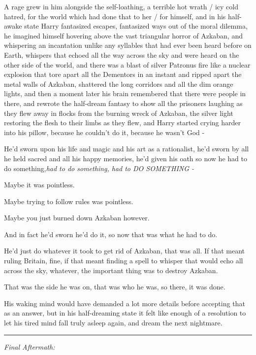 A rage grew in him alongside the self-loathing, a terrible hot wrath /
icy cold hatred, for the world which had done that to her / for himself,
and in his half-awake state Harry fantasized escapes, fantasized ways
out of the moral dilemma, he imagined himself hovering above the vast
triangular horror of Azkaban, and whispering an incantation unlike any
syllables that had ever been heard before on Earth, whispers that echoed
all the way across the sky and were heard on the other side of the
world, and there was a blast of silver Patronus fire like a nuclear
explosion that tore apart all the Dementors in an instant and ripped
apart the metal walls of Azkaban, shattered the long corridors and all
the dim orange lights, and then a moment later his brain remembered that
there were people in there, and rewrote the half-dream fantasy to show
all the prisoners laughing as they flew away in flocks from the burning
wreck of Azkaban, the silver light restoring the flesh to their limbs as
they flew, and Harry started crying harder into his pillow, because he
couldn't do it, because he wasn't God -

He'd sworn upon his life and magic and his art as a rationalist, he'd
sworn by all he held sacred and all his happy memories, he'd given his
oath so now he had to do something,\emph{had to do something, had to DO
SOMETHING -}

Maybe it was pointless.

Maybe trying to follow rules was pointless.

Maybe you just burned down Azkaban however.

And in fact he'd sworn he'd do it, so now that was what he had to do.

He'd just do whatever it took to get rid of Azkaban, that was all. If
that meant ruling Britain, fine, if that meant finding a spell to
whisper that would echo all across the sky, whatever, the important
thing was to destroy Azkaban.

That was the side he was on, that was who he was, so there, it was done.

His waking mind would have demanded a lot more details before accepting
that as an answer, but in his half-dreaming state it felt like enough of
a resolution to let his tired mind fall truly asleep again, and dream
the next nightmare.

\begin{center}\rule{3in}{0.4pt}\end{center}

\emph{Final Aftermath:}

